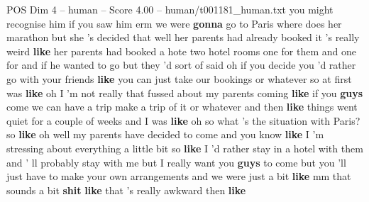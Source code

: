 \begin{textsample}{POS Dim 4 – human – Score 4.00 – human/t001181\_human.txt}  \label{ex:f4_pos_005}
you might recognise him if you saw him erm we were \textbf{gonna} go to Paris where does her marathon but she 's decided that well her parents had already booked it 's really weird \textbf{like} her parents had booked a hote two hotel rooms one for them and one for and if he wanted to go but they 'd sort of said oh if you decide you 'd rather go with your friends \textbf{like} you can just take our bookings or whatever so at first was \textbf{like} oh I 'm not really that fussed about my parents coming \textbf{like} if you \textbf{guys} come we can have a trip make a trip of it or whatever and then \textbf{like} things went quiet for a couple of weeks and I was \textbf{like} oh so what 's the situation with Paris? so \textbf{like} oh well my parents have decided to come and you know \textbf{like} I 'm stressing about everything a little bit so \textbf{like} I 'd rather stay in a hotel with them and ' ll probably stay with me but I really want you \textbf{guys} to come but you 'll just have to make your own arrangements and we were just a bit \textbf{like} mm that sounds a bit \textbf{shit} \textbf{like} that 's really awkward then \textbf{like}

\end{textsample}
